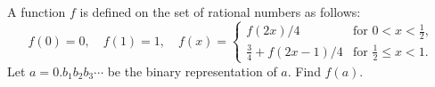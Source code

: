 A function $f$ is defined on the set of rational numbers as follows:
\[ f(0) = 0,\quad f(1) = 1,\quad f(x) = \begin{cases} f(2x)/4 & \text{for } 0 < x < \frac{1}{2},\\ \frac{3}{4} + f(2x - 1)/4 & \text{for } \frac{1}{2} \leq x < 1. \end{cases} \]
Let $a = 0.b_1b_2b_3\cdots$ be the binary representation of $a$. Find $f(a)$.
